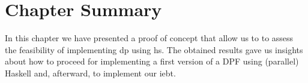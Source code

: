 \section{Chapter Summary}
In this chapter we have presented a proof of concept that allow us to to assess the feasibility of implementing \acrshort{dp} using \acrshort{hs}. 
The  obtained results gave us insights about how to proceed for implementing a first version of a DPF using (parallel) Haskell and, afterward, to implement our \acrshort{iebt}.

